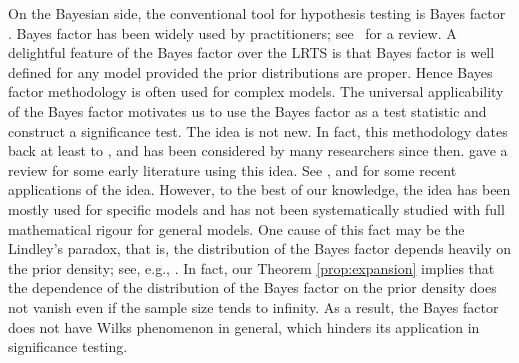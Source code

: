 \documentclass[11pt]{article}
\theoremstyle{plain}
\theoremstyle{definition}
\theoremstyle{remark}
\begin{document}
On the Bayesian side, the conventional tool for hypothesis testing is Bayes factor \citep{scientificInference}.
Bayes factor has been widely used by practitioners; see~\cite{Robert1995Bayes} for a review.
A delightful feature of the Bayes factor over the LRTS is that Bayes factor is well defined for any model provided the prior distributions are proper.
Hence Bayes factor methodology is often used for complex models.
The universal applicability of the Bayes factor motivates us to use the Bayes factor as a test statistic and construct a significance test.
The idea is not new.
In fact, this methodology dates back at least to \cite{Good1967}, and has been considered by many researchers since then.
\cite{Good1992} gave a review for some early literature using this idea.
See \cite{Aerts2004}, \cite{zhou2018On} and \cite{Wang2020} for some recent applications of the idea.
However, to the best of our knowledge, the idea has been mostly used for specific models and has not been systematically studied with full mathematical rigour for general models.
One cause of this fact may be the Lindley's paradox, that is, the distribution of the Bayes factor depends heavily on the prior density; see, e.g., \cite{Shafer1982}.
In fact, our Theorem \ref{prop:expansion} implies that the dependence of the distribution of the Bayes factor on the prior density does not vanish even if the sample size tends to infinity.
As a result, the Bayes factor does not have Wilks phenomenon in general, which hinders its application in significance testing.
\end{document}
